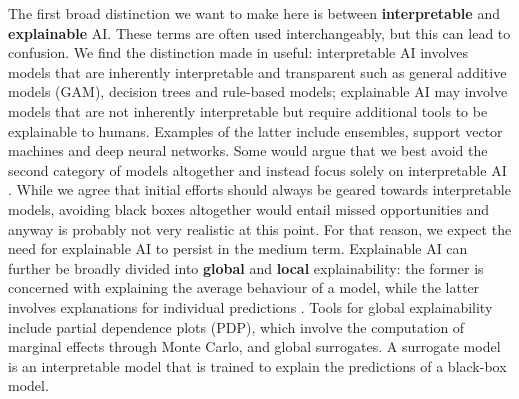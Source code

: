 \documentclass{juliacon}
\begin{document}
The first broad distinction we want to make here is between
\textbf{interpretable} and \textbf{explainable} AI. These terms are
often used interchangeably, but this can lead to confusion. We find the
distinction made in \cite{rudin2019stop} useful: interpretable AI
involves models that are inherently interpretable and transparent such
as general additive models (GAM), decision trees and rule-based models;
explainable AI may involve models that are not inherently interpretable
but require additional tools to be explainable to humans. Examples of
the latter include ensembles, support vector machines and deep neural
networks. Some would argue that we best avoid the second category of
models altogether and instead focus solely on interpretable AI
\cite{rudin2019stop}. While we agree that initial efforts should always
be geared towards interpretable models, avoiding black boxes altogether
would entail missed opportunities and anyway is probably not very
realistic at this point. For that reason, we expect the need for
explainable AI to persist in the medium term. Explainable AI can further
be broadly divided into \textbf{global} and \textbf{local}
explainability: the former is concerned with explaining the average
behaviour of a model, while the latter involves explanations for
individual predictions \cite{molnar2020interpretable}. Tools for global
explainability include partial dependence plots (PDP), which involve the
computation of marginal effects through Monte Carlo, and global
surrogates. A surrogate model is an interpretable model that is trained
to explain the predictions of a black-box model.
\end{document}
